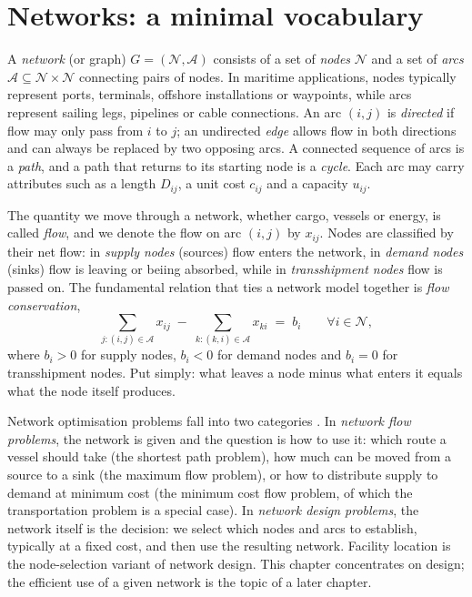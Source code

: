 \section{Networks: a minimal vocabulary}
\label{sec:fl-networks}

A \emph{network} (or graph) $G=(\mathcal{N},\mathcal{A})$ consists of a set of \emph{nodes} $\mathcal{N}$ and a set of \emph{arcs} $\mathcal{A}\subseteq\mathcal{N}\times\mathcal{N}$ connecting pairs of nodes. In maritime applications, nodes typically represent ports, terminals, offshore installations or waypoints, while arcs represent sailing legs, pipelines or cable connections. An arc $(i,j)$ is \emph{directed} if flow may only pass from $i$ to $j$; an undirected \emph{edge} allows flow in both directions and can always be replaced by two opposing arcs. A connected sequence of arcs is a \emph{path}, and a path that returns to its starting node is a \emph{cycle}. Each arc may carry attributes such as a length $D_{ij}$, a unit cost $c_{ij}$ and a capacity $u_{ij}$.

The quantity we move through a network, whether cargo, vessels or energy, is called \emph{flow}, and we denote the flow on arc $(i,j)$ by $x_{ij}$. Nodes are classified by their net flow: in \emph{supply nodes} (sources) flow enters the network, in \emph{demand nodes} (sinks) flow is leaving or beiing absorbed, while in \emph{transshipment nodes} flow is passed on. The fundamental relation that ties a network model together is \emph{flow conservation},
\begin{equation}
  \sum_{j:(i,j)\in\mathcal{A}} x_{ij} \;-\; \sum_{k:(k,i)\in\mathcal{A}} x_{ki} \;=\; b_i
  \qquad \forall i\in\mathcal{N},
  \label{eq:fl-flowcons}
\end{equation}
where $b_i>0$ for supply nodes, $b_i<0$ for demand nodes and $b_i=0$ for transshipment nodes. Put simply: what leaves a node minus what enters it equals what the node itself produces.

Network optimisation problems fall into two categories \citep{Lundgren2010}. In \emph{network flow problems}, the network is given and the question is how to use it: which route a vessel should take (the shortest path problem), how much can be moved from a source to a sink (the maximum flow problem), or how to distribute supply to demand at minimum cost (the minimum cost flow problem, of which the transportation problem is a special case). In \emph{network design problems}, the network itself is the decision: we select which nodes and arcs to establish, typically at a fixed cost, and then use the resulting network. Facility location is the node-selection variant of network design. This chapter concentrates on design; the efficient use of a given network is the topic of a later chapter.

